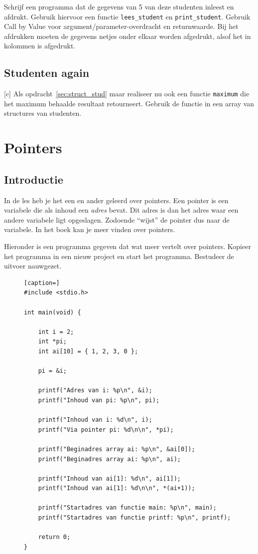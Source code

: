 \documentclass[a4paper,10pt,fleqn,twoside]{article}
\begin{document}
Schrijf een programma dat de gegevens van 5 van deze studenten inleest en afdrukt. Gebruik hiervoor een functie \lstinline|lees_student| en \lstinline|print_student|. Gebruik Call by Value voor argument/parameter-overdracht en returnwaarde. Bij het afdrukken moeten de gegevens netjes onder elkaar worden afgedrukt, alsof het in kolommen is afgedrukt.


\subsection{Studenten again}[c]
Als opdracht~\ref{sec:struct_stud} maar realiseer nu ook een functie \lstinline|maximum| die het maximum behaalde resultaat retourneert. Gebruik de functie in een array van structures van studenten.





\clearpage
\section{Pointers}
\subsection{Introductie}
In de les heb je het een en ander geleerd over pointers. Een pointer is een variabele die als inhoud een \textsl{adres} bevat. Dit adres is dan het adres waar een andere variabele ligt opgeslagen. Zodoende ``wijst'' de pointer dus naar de variabele. In het boek kan je meer vinden over pointers.

Hieronder is een programma gegeven dat wat meer vertelt over pointers. Kopieer het programma in een nieuw project en start het programma. Bestudeer de uitvoer nauwgezet.

\begin{figure}[H]
\centering
\begin{lstlisting}[caption=]
#include <stdio.h>

int main(void) {

    int i = 2;
    int *pi;
    int ai[10] = { 1, 2, 3, 0 };

    pi = &i;

    printf("Adres van i: %p\n", &i);
    printf("Inhoud van pi: %p\n", pi);

    printf("Inhoud van i: %d\n", i);
    printf("Via pointer pi: %d\n\n", *pi);

    printf("Beginadres array ai: %p\n", &ai[0]);
    printf("Beginadres array ai: %p\n", ai);

    printf("Inhoud van ai[1]: %d\n", ai[1]);
    printf("Inhoud van ai[1]: %d\n\n", *(ai+1));

    printf("Startadres van functie main: %p\n", main);
    printf("Startadres van functie printf: %p\n", printf);

    return 0;
}
\end{lstlisting}
\end{figure}
\end{document}
